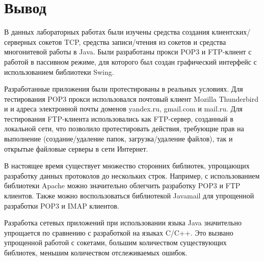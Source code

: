 \section{Вывод}

В данных лабораторных работах были изучены средства создания клиентских/серверных сокетов TCP, средства записи/чтения из сокетов и средства многонитевой работы в Java. Были разработаны прокси POP3 и FTP-клиент с работой в пассивном режиме, для которого был создан графический интерфейс с использованием библиотеки Swing.

Разработанные приложения были протестированы в реальных условиях. Для тестирования POP3 прокси использовался почтовый клиент Mozilla Thunderbird и и адреса электронной почты доменов yandex.ru, gmail.com и mail.ru. Для тестирования FTP-клиента использовались как FTP-сервер, созданный в локальной сети, что позволило протестировать действия, требующие прав на выполнение (создание/удаление папок, загрузка/удаление файлов), так и открытые файловые серверы в сети Интернет.

В настоящее время существует множество сторонних библиотек, упрощающих разработку данных протоколов до нескольких строк. Например, с использованием библиотеки Apache можно значительно облегчить разработку POP3 и FTP клиентов. Также можно воспользоваться библиотекой Javamail для упрощенной разработки POP3 и IMAP клиентов.

Разработка сетевых приложений при использовании языка Java значительно упрощается по сравнению с разработкой на языках C/C++. Это вызвано упрощенной работой с сокетами, большим количеством существующих библиотек, меньшим количеством отслеживаемых ошибок.































































